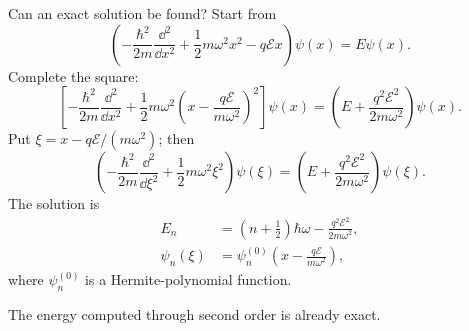 Can an exact solution be found? Start from
\begin{equation}
 \left(-\frac{\hbar^2}{2m}\frac{\dd^2}{\dd x^2}
 +\frac12m\omega^2x^2-q\mathcal E x\right)\psi(x)=E\psi(x).
\end{equation}
Complete the square:
\begin{equation}
 \left[-\frac{\hbar^2}{2m}\frac{\dd^2}{\dd x^2}
 +\frac12m\omega^2\left(x-\frac{q\mathcal E}{m\omega^2}\right)^2\right]\psi(x)
 =\left(E+\frac{q^2\mathcal E^2}{2m\omega^2}\right)\psi(x).
\end{equation}
Put $\xi=x-q\mathcal E/(m\omega^2)$; then
\begin{equation}
 \left(-\frac{\hbar^2}{2m}\frac{\dd^2}{\dd\xi^2}
 +\frac12m\omega^2\xi^2\right)\psi(\xi)
 =\left(E+\frac{q^2\mathcal E^2}{2m\omega^2}\right)\psi(\xi).
\end{equation}
The solution is
\begin{equation}
 \boxed{\begin{aligned}
 E_n&=\left(n+\frac12\right)\hbar\omega
 -\frac{q^2\mathcal E^2}{2m\omega^2},\\
 \psi_n(\xi)&=\psi_n^{(0)}\left(x-\frac{q\mathcal E}{m\omega^2}\right),
 \end{aligned}}
\end{equation}
where $\psi_n^{(0)}$ is a Hermite-polynomial function.

The energy computed through second order is already exact.